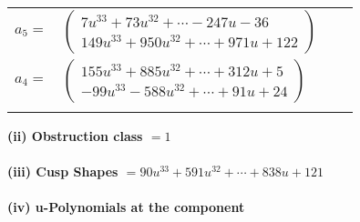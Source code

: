 \documentclass[1p]{elsarticle_modified}
\theoremstyle{definition}
\begin{document}
\begin{tabular}{m{7pt} m{180pt} m{7pt} m{180pt} }
\flushright $a_{5}=$&$\begin{pmatrix}7 u^{33}+73 u^{32}+\cdots-247 u-36\\149 u^{33}+950 u^{32}+\cdots+971 u+122\end{pmatrix}$ \\
\flushright $a_{4}=$&$\begin{pmatrix}155 u^{33}+885 u^{32}+\cdots+312 u+5\\-99 u^{33}-588 u^{32}+\cdots+91 u+24\end{pmatrix}$\\&\end{tabular}
\flushleft \textbf{(ii) Obstruction class $= 1$}\\~\\
\flushleft \textbf{(iii) Cusp Shapes $= 90 u^{33}+591 u^{32}+\cdots+838 u+121$}\\~\\
\newpage\renewcommand{\arraystretch}{1}
\flushleft \textbf{(iv) u-Polynomials at the component}\newline \\
\end{document}
